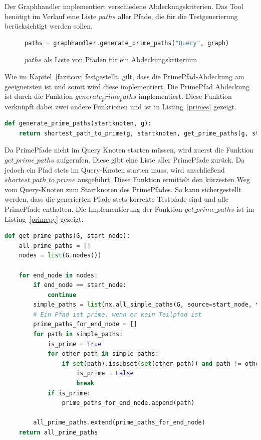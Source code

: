 Der Graphhandler implementiert verschiedene Abdeckungskriterien.
Das Tool benötigt im Verlauf eine Liste $paths$ aller Pfade, die für die Testgenerierung berücksichtigt werden sollen.

\begin{figure}[H]
    \begin{lstlisting}[language=Python]
paths = graphhandler.generate_prime_paths("Query", graph)
    \end{lstlisting}
    \caption{$paths$ als Liste von Pfaden für ein Abdeckungskriterium}
\end{figure}

Wie im Kapitel~\ref{fazitcov} festgestellt, gilt, dass die PrimePfad-Abdeckung am geeignetsten ist und somit wird diese implementiert.
Die PrimePfad Abdeckung ist durch die Funktion $generate_prime_paths$ implementiert.
Diese Funktion verknüpft dabei zwei andere Funktionen und ist in Listing~\ref{primes} gezeigt.

\begin{lstlisting}[language=Python,caption={valide PrimePfad Generierung}, label={primes}]
def generate_prime_paths(startknoten, g):
    return shortest_path_to_prime(g, startknoten, get_prime_paths(g, startknoten))
\end{lstlisting}

Da PrimePfade nicht im Query Knoten starten müssen, wird zuerst die Funktion $get\_prime\_paths$ aufgerufen.
Diese gibt eine Liste aller PrimePfade zurück.
Da jedoch ein Pfad stets im Query-Knoten starten muss, wird anschließend $shortest\_path\_to\_prime$ ausgeführt.
Diese Funktion ermittelt den kürzesten Weg vom Query-Knoten zum Startknoten des PrimePfades.
So kann sichergestellt werden, dass die generierten Pfade stets korrekte Testpfade sind und alle PrimePfade enthalten.
Die Implementierung der Funktion $get\_prime\_paths$ ist im Listing~\ref{primepy} gezeigt.

\begin{lstlisting}[language=Python, caption={PrimePfad Algorithmus}, label={primepy}]
def get_prime_paths(G, start_node):
    all_prime_paths = []
    nodes = list(G.nodes())

    for end_node in nodes:
        if end_node == start_node:
            continue
        simple_paths = list(nx.all_simple_paths(G, source=start_node, target=end_node))
        # Ein Pfad ist prime, wenn er kein Teilpfad ist
        prime_paths_for_end_node = []
        for path in simple_paths:
            is_prime = True
            for other_path in simple_paths:
                if set(path).issubset(set(other_path)) and path != other_path:
                    is_prime = False
                    break
            if is_prime:
                prime_paths_for_end_node.append(path)

        all_prime_paths.extend(prime_paths_for_end_node)
    return all_prime_paths
\end{lstlisting}

